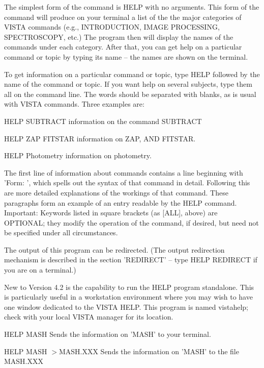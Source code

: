 The simplest form of the command is HELP with no arguments.  This form of
the command will produce on your terminal a list of the the major
categories of VISTA commands (e.g., INTRODUCTION, IMAGE PROCESSING,
SPECTROSCOPY, etc.)  The program then will display the names of the
commands under each category.  After that, you can get help on a particular
command or topic by typing its name -- the names are shown on the terminal.

To get information on a particular command or topic, type HELP followed by
the name of the command or topic.  If you want help on several subjects,
type them all on the command line.  The words should be separated with
blanks, as is usual with VISTA commands. Three examples are:
\begin{example}
   \item[HELP SUBTRACT \hfill]{information on the command SUBTRACT}
   \item[HELP ZAP FITSTAR \hfill]{information on ZAP, AND FITSTAR.}
   \item[HELP Photometry \hfill]{information on photometry.}
\end{example}

The first line of information about commands contains a line beginning with
'Form: ', which spells out the syntax of that command in detail.  Following
this are more detailed explanations of the workings of that command.  These
paragraphs form an example of an entry readable by the HELP command.
Important: Keywords listed in square brackets (as [ALL], above) are
OPTIONAL; they modify the operation of the command, if desired, but need
not be specified under all circumstances.

The output of this program can be redirected. (The output redirection
mechanism is described in the section 'REDIRECT' -- type HELP REDIRECT if
you are on a terminal.)  

New to Version 4.2 is the capability to run the HELP program standalone.
This is particularly useful in a workstation environment where you may wish
to have one window dedicated to the VISTA HELP. This program is named
vistahelp; check with your local VISTA manager for its location.


\begin{example}
   \item[HELP MASH\hfill]{Sends the information on 'MASH'
        to your terminal.}
   \item[HELP MASH $>$MASH.XXX\hfill]{Sends the information on 'MASH'
        to the file MASH.XXX}
\end{example}

